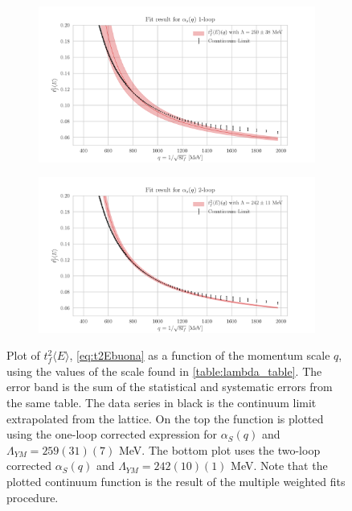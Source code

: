 \begin{figure}[hbt!]
    \centering
    \begin{subfigure}{0.7\textwidth}
        \centering
        \includegraphics[width=1\textwidth]{results/End1.pdf}
    \end{subfigure}
    \begin{subfigure}{0.7\textwidth}
        \centering
        \includegraphics[width=1\textwidth]{results/End2.pdf}
    \end{subfigure}

    \caption{Plot of $t_f^2\langle E\rangle$, \cref{eq:t2Ebuona} as a function of the momentum scale $q$, using the values of the scale found in \cref{table:lambda_table}. The error band is the sum of the statistical and systematic errors from the same table. The data series in black is the continuum limit extrapolated from the lattice. On the top the function is plotted using the one-loop corrected expression for $\alpha_S(q)$ and $\Lambda_{YM} =259(31)(7)$ MeV. The bottom plot uses the two-loop corrected  $\alpha_S(q)$ and $\Lambda_{YM} =242(10)(1)$ MeV. Note that the plotted continuum function is the result of the multiple weighted fits procedure.}
    \label{fig:end}
\end{figure}
